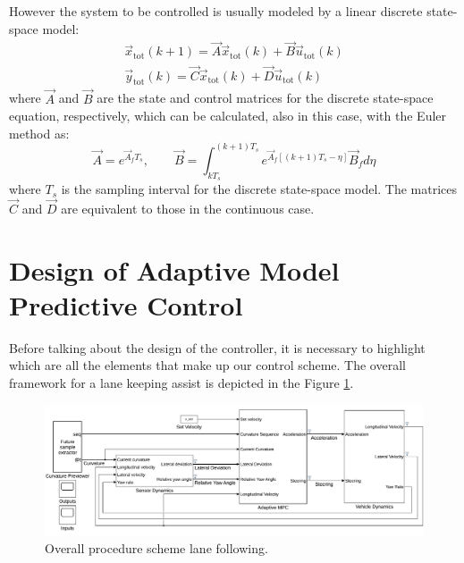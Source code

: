 However the system to be controlled is usually modeled by a linear discrete state-space model:
\begin{equation}
\label{eqn:full_dynamics_model_disc}
\begin{array}{rr}
{\vec{x}}_{\text{tot}}(k+1) =\vec{A} \vec{x}_{\text{tot}}(k)+ \vec{B} \vec{u}_{\text{tot}}(k)\\
\vec{y}_{\text{tot}}(k) = \vec{C}\vec{x}_{\text{tot}}(k) + \vec{D} \vec{u}_{\text{tot}}(k)
\end{array}
\end{equation}
where $\vec{A}$ and $\vec{B}$ are the state and control matrices for the discrete state-space equation, respectively, which can be calculated, also in this case, with the Euler method as:
\begin{equation}
	\vec{A} = e^{\vec{A}_fT_s},\qquad \vec{B} = \int_{kT_s}^{(k+1)T_s} e^{\vec{A}_f[(k+1)T_s-\eta]}\vec{B}_f d\eta
\end{equation}
where $T_s$ is the sampling interval for the discrete state-space model. The matrices $\vec{C}$ and $\vec{D}$ are equivalent to those in the continuous case.

\section{Design of Adaptive Model Predictive Control}
Before talking about the design of the controller, it is necessary to highlight which are all the elements that make up our control scheme. The overall framework for a lane keeping assist is depicted in the Figure \ref{fig:scheme_lane_following}.
\begin{figure}[!h]
	\centering
	\includegraphics[width=\textwidth]{./figure/lane_following_AMPC.pdf}
	\caption{Overall procedure scheme lane following.}
	\label{fig:scheme_lane_following}
\end{figure}

